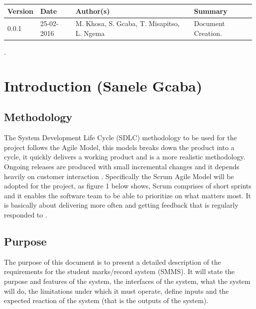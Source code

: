 \documentclass[10pt,onecolumn]{RequimentsGathering}
\begin{document}
	
	\begin{center}
		\begin{tabular}{ | p{2cm} | p{3cm} | p{5cm} | p{5cm} |}
			\hline
			\textbf{Version}& \textbf{Date}& \textbf{Author(s)} & \textbf{Summary} \\ \hline
			0.0.1 & 25-02-2016 & M.$\;$Khosa, S.$\;$Gcaba, T.$\;$Misapitso, L.$\;$Ngema& Document Creation. \\ \hline
			
		\end{tabular}
	\end{center}
	
	\newpage
	
	
	\pagestyle{plain}.
	\section{Introduction (Sanele Gcaba)}
	
	\subsection{Methodology}
	
	The System Development Life Cycle (SDLC) methodology to be used for the project follows the Agile Model, this models breaks down the product into a cycle, it quickly delivers a working product and is a more realistic methodology. Ongoing releases are produced with small incremental changes and it depends heavily on customer interaction \cite{ref7}. Specifically the Scrum Agile Model will be adopted for the project, as figure 1 below shows, Scrum comprises of short sprints and it enables the software team to be able to prioritize on what matters most. It is basically about delivering more often and getting feedback that is regularly responded to \cite{ref8}.           
	
	\subsection{Purpose}
	
	The purpose of this document is to present a detailed description of the requirements for the student marks/record system (SMMS). It will state the purpose and features of the system, the interfaces of the system, what the system will do, the limitations under which it must operate, define inputs and the expected reaction of the system (that is the outputs of the system). 
	
\end{document}
